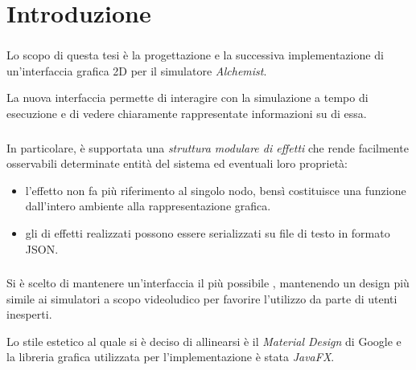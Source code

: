 
\section{Introduzione}\label{sec:intro}
\begin{frame}
    \frametitle{\insertsection}

    Lo scopo di questa tesi è la progettazione e la successiva implementazione di un'interfaccia grafica 2D per il simulatore \emph{Alchemist}.

    \medskip %
    \pause

    La nuova interfaccia permette di interagire con la simulazione a tempo di esecuzione e di vedere chiaramente rappresentate informazioni su di essa.
\end{frame}

\begin{frame}
    \frametitle{\insertsection}

    In particolare, è supportata una \emph{struttura modulare di effetti} che rende facilmente osservabili determinate entità del sistema ed eventuali loro proprietà:

    \begin{itemize}[<+(1)->]
        \item
            l'effetto non fa più riferimento al singolo nodo, bensì costituisce una funzione dall'intero ambiente alla rappresentazione grafica.
        \item
            gli  di effetti realizzati possono essere serializzati su file di testo in formato JSON.
    \end{itemize}
\end{frame}

\begin{frame}
    \frametitle{\insertsection}

    Si è scelto di mantenere un'interfaccia il più possibile , mantenendo un design più simile ai simulatori a scopo videoludico per favorire l'utilizzo da parte di utenti inesperti.

    \medskip
    \pause

    Lo stile estetico al quale si è deciso di allinearsi è il \emph{Material Design} di Google e la libreria grafica utilizzata per l'implementazione è stata \emph{JavaFX}.
\end{frame}

